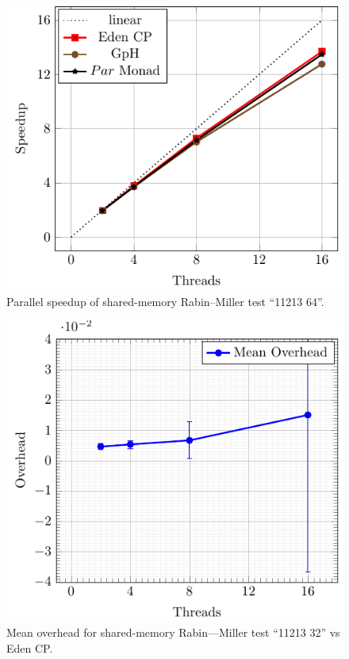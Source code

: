 \documentclass[paper=A4,twoside=true,openright,parskip=full,chapterprefix=true,headings=normal,bibliography=totoc,listof=totoc,titlepage=on,captions=tableabove,draft=false,british]{scrreprt}%
\renewcommand{\enquote}[1]{{``}#1{''}}
\begin{document}
\begin{figure}
\centering
\includegraphics{src/img/perfSMRM64.pdf}
\caption{Parallel speedup of shared-memory Rabin--Miller test
\enquote{11213 64}.\label{fig:perfSMRM64}}
\end{figure}

\begin{figure}
\centering
\includegraphics{src/img/overSMRM32Eden.pdf}
\caption{Mean overhead for shared-memory Rabin---Miller test
\enquote{11213 32} vs Eden CP.\label{fig:overSMRM32Eden}}
\end{figure}
\end{document}
